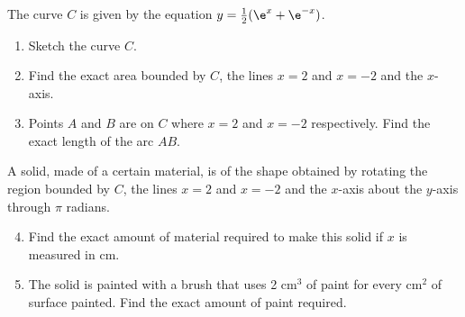 \begin{problem}
    The curve $C$ is given by the equation $y = \frac12(\e^x + \e^{-x})$.

    \begin{enumerate}
        \item Sketch the curve $C$.
        \item Find the exact area bounded by $C$, the lines $x = 2$ and $x = -2$ and the $x$-axis.
        \item Points $A$ and $B$ are on $C$ where $x = 2$ and $x = -2$ respectively. Find the exact length of the arc $AB$.
    \end{enumerate}

    A solid, made of a certain material, is of the shape obtained by rotating the region bounded by $C$, the lines $x = 2$ and $x = -2$ and the $x$-axis about the $y$-axis through $\pi$ radians.

    \begin{enumerate}
        \setcounter{enumi}{3}
        \item Find the exact amount of material required to make this solid if $x$ is measured in cm.
        \item The solid is painted with a brush that uses 2 cm$^3$ of paint for every cm$^2$ of surface painted. Find the exact amount of paint required.
    \end{enumerate}
\end{problem}
